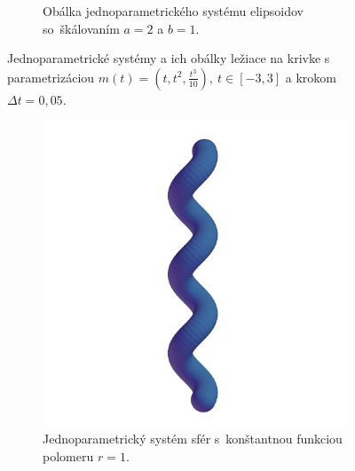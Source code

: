 \documentclass[12pt, twoside]{book}
\begin{document}
\begin{figure}[h]
\begin{subfigure}[t]{0.49\textwidth}
        	\caption{Obálka jednoparametrického systému elipsoidov so~škálovaním $a=2$ a $b=1$.}
        \label{fig:plocha6}
    \end{subfigure}
    	\caption[Katalóg vytlačených plôch I.]{Jednoparametrické systémy a ich obálky ležiace na krivke s parametrizáciou  $m(t)=(t, t^2, \frac{t^3}{10}), \  t \in [-3, 3]$ a krokom $\Delta t = 0,05$.}
    \label{fig:katalogI}
\end{figure}

\begin{figure}[h]
	\centering
	\captionsetup{justification=centering}
	\captionsetup[subfigure]{justification=centering}
    \begin{subfigure}[t]{0.32\textwidth}
        \centering
        \includegraphics[width=\textwidth]{images/helix_spheres.png}
		\caption{Jednoparametrický systém sfér s~konštantnou funkciou polomeru $r=1.$}
        \label{fig:plocha7}
    \end{subfigure}
    \hfill
    \begin{subfigure}[t]{0.32\textwidth}
        \centering

\end{subfigure}
\end{figure}
\end{document}
